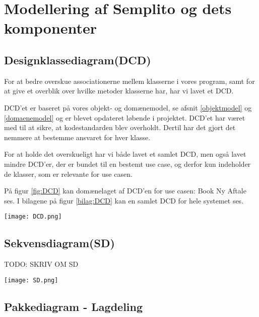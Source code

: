 \section{Modellering af Semplito og dets komponenter}
\subsection{Designklassediagram(DCD)}
\label{DCD}

For at bedre overskue associationerne mellem klasserne i vores program, samt for at give et overblik over hvilke metoder klasserne har, har vi lavet et DCD. 

DCD'et er baseret på vores objekt- og domænemodel, se afsnit \ref{objektmodel} og \ref{domaenemodel} og er blevet opdateret løbende i projektet.
DCD'et har været med til at sikre, at kodestandarden blev overholdt.
Dertil har det gjort det nemmere at bestemme ansvaret for hver klasse.

For at holde det overskueligt har vi både lavet et samlet DCD, men også lavet mindre DCD'er, der er bundet til en bestemt use case, og derfor kun indeholder de klasser, som er relevante for use casen.

På figur \ref{fig:DCD} kan domænelaget af DCD'en for use casen: Book Ny Aftale ses.
I bilagene på figur \ref{bilag:DCD} kan en samlet DCD for hele systemet ses.


\begin{sidewaysfigure}
    \caption{DCD for Semplito - Bookingsystemet}
    \centering
        \texttt{[image: DCD.png]}
    \label{fig:DCD}
\end{sidewaysfigure}

\subsection{Sekvensdiagram(SD)}
\label{SD}

TODO: SKRIV OM SD

\begin{sidewaysfigure}
    \caption{SD for SOC Operation - createAppointment}
    \centering
        \texttt{[image: SD.png]}
    \label{fig:SD}
\end{sidewaysfigure}

\subsection{Pakkediagram - Lagdeling}
\label{Pakkediagram}

